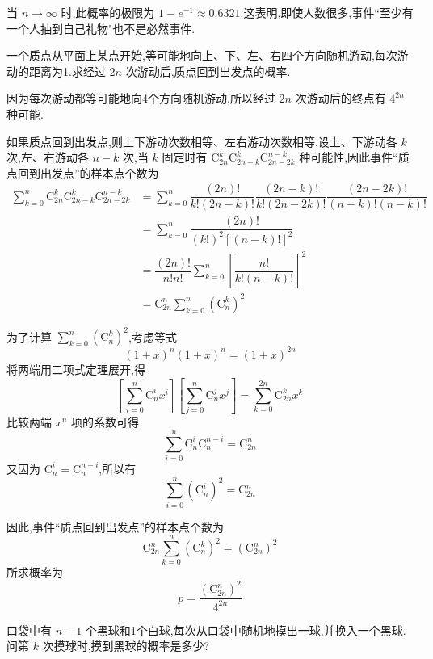 \begin{note}
    \indent 当 $n \to \infty$ 时,此概率的极限为 $1 - e^{-1} \approx 0.6321$.这表明,即使人数很多,事件``至少有一个人抽到自己礼物"也不是必然事件.
\end{note}

\question 一个质点从平面上某点开始,等可能地向上、下、左、右四个方向随机游动,每次游动的距离为1.求经过 $2n$ 次游动后,质点回到出发点的概率.

\begin{solution}
    因为每次游动都等可能地向4个方向随机游动,所以经过 $2n$ 次游动后的终点有 $4^{2n}$ 种可能.

    如果质点回到出发点,则上下游动次数相等、左右游动次数相等.设上、下游动各 $k$ 次,左、右游动各 $n-k$ 次,当 $k$ 固定时有 $\mathrm{C}_{2n}^k \mathrm{C}_{2n-k}^k \mathrm{C}_{2n-2k}^{n-k}$ 种可能性,因此事件``质点回到出发点''的样本点个数为
    $$
    \begin{aligned}
        \sum_{k=0}^{n} \mathrm{C}_{2n}^k \mathrm{C}_{2n-k}^k \mathrm{C}_{2n-2k}^{n-k} &= \sum_{k=0}^{n} \dfrac{(2n)!}{k! (2n-k)!} \dfrac{(2n-k)!}{k! (2n-2k)!} \dfrac{(2n-2k)!}{(n-k)! (n-k)!} \\
        &= \sum_{k=0}^{n} \dfrac{(2n)!}{(k!)^2 [(n-k)!]^2} \\
        &= \dfrac{(2n)!}{n! n!} \sum_{k=0}^{n} \left[ \dfrac{n!}{k! (n-k)!} \right]^2 \\
        &= \mathrm{C}_{2n}^n \sum_{k=0}^{n} (\mathrm{C}_n^k)^2
    \end{aligned}
    $$

    为了计算 $\displaystyle\sum_{k=0}^{n} (\mathrm{C}_n^k)^2$,考虑等式
    $$
    (1+x)^n (1+x)^n = (1+x)^{2n}
    $$
    将两端用二项式定理展开,得
    $$
    \left[ \sum_{i=0}^{n} \mathrm{C}_n^i x^i \right] \left[ \sum_{j=0}^{n} \mathrm{C}_n^j x^j \right] = \sum_{k=0}^{2n} \mathrm{C}_{2n}^k x^k
    $$
    比较两端 $x^n$ 项的系数可得
    $$
    \sum_{i=0}^{n} \mathrm{C}_n^i \mathrm{C}_n^{n-i} = \mathrm{C}_{2n}^n
    $$
    又因为 $\mathrm{C}_n^i = \mathrm{C}_n^{n-i}$,所以有
    $$
    \sum_{i=0}^{n} (\mathrm{C}_n^i)^2 = \mathrm{C}_{2n}^n
    $$
    
    因此,事件``质点回到出发点''的样本点个数为
    $$
    \mathrm{C}_{2n}^n \sum_{k=0}^{n} (\mathrm{C}_n^k)^2 = (\mathrm{C}_{2n}^n)^2
    $$
    所求概率为
    $$
    p = \dfrac{(\mathrm{C}_{2n}^n)^2}{4^{2n}}
    $$
\end{solution}

\question 口袋中有 $n-1$ 个黑球和1个白球,每次从口袋中随机地摸出一球,并换入一个黑球.问第 $k$ 次摸球时,摸到黑球的概率是多少?

